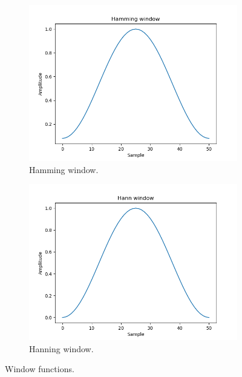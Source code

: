 \documentclass[12pt, twocolumn]{report}
\begin{document}
\begin{figure}[htbp]
    \centering
    \begin{subfigure}{0.45\textwidth}
        \centering
        \includegraphics[width=1\textwidth]{Figures/FT window Hamming.png}
        \caption{Hamming window.}
    \end{subfigure}
    \begin{subfigure}{0.45\textwidth}
        \centering
        \includegraphics[width=1\textwidth]{Figures/FT window Hann.png}
        \caption{Hanning window.}
    \end{subfigure}
    \caption{Window functions.}
    \label{FT window functions}
\end{figure}
\end{document}
